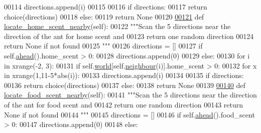 \begin{DoxyCode}
00114                     directions.append(i) 
00115 
00116         \textcolor{keywordflow}{if} directions:
00117             \textcolor{keywordflow}{return} choice(directions)
00118         \textcolor{keywordflow}{else}:
00119             \textcolor{keywordflow}{return} \textcolor{keywordtype}{None}
00120 
\hypertarget{ants_8py_source_l00121}{}\hyperlink{classants_1_1Ant_a81a141f3417ddb32b8d1abbd95bbc477}{00121}     \textcolor{keyword}{def }\hyperlink{classants_1_1Ant_a81a141f3417ddb32b8d1abbd95bbc477}{locate\_home\_scent\_nearby}(self):
00122         \textcolor{stringliteral}{"""Scan the 5 directions near the direction of the ant for home scent and}
00123 \textcolor{stringliteral}{        return one random direction}
00124 \textcolor{stringliteral}{        return None if not found}
00125 \textcolor{stringliteral}{        """}
00126         directions = []
00127         \textcolor{keywordflow}{if} self.\hyperlink{classants_1_1Ant_ac2c8f048d99cd48a5829ddf7ff4a708a}{ahead}().home\_scent > 0:
00128             directions.append(0)
00129         \textcolor{keywordflow}{else}:
00130             \textcolor{keywordflow}{for} i \textcolor{keywordflow}{in} xrange(-2, 3):
00131                 \textcolor{keywordflow}{if} self.\hyperlink{classants_1_1Ant_a55f64c7cafb3806bdcfda42586adbff5}{world}[self.\hyperlink{classants_1_1Ant_a2ddd97dadaa5d24c459b0117dc6e1190}{neighbour}(i)].home\_scent > 0:
00132                     \textcolor{keywordflow}{for} x \textcolor{keywordflow}{in} xrange(1,11-5*abs(i)):
00133                         directions.append(i) 
00134 
00135         \textcolor{keywordflow}{if} directions:
00136             \textcolor{keywordflow}{return} choice(directions)
00137         \textcolor{keywordflow}{else}:
00138             \textcolor{keywordflow}{return} \textcolor{keywordtype}{None}
00139 
\hypertarget{ants_8py_source_l00140}{}\hyperlink{classants_1_1Ant_a97ffad1c0e634f38585e7913908e9524}{00140}     \textcolor{keyword}{def }\hyperlink{classants_1_1Ant_a97ffad1c0e634f38585e7913908e9524}{locate\_food\_scent\_nearby}(self):
00141         \textcolor{stringliteral}{"""Scan the 5 directions near the direction of the ant for food scent and}
00142 \textcolor{stringliteral}{        return one random direction}
00143 \textcolor{stringliteral}{        return None if not found}
00144 \textcolor{stringliteral}{        """}
00145         directions = []
00146         \textcolor{keywordflow}{if} self.\hyperlink{classants_1_1Ant_ac2c8f048d99cd48a5829ddf7ff4a708a}{ahead}().food\_scent > 0:
00147             directions.append(0)
00148         \textcolor{keywordflow}{else}:

\end{DoxyCode}
